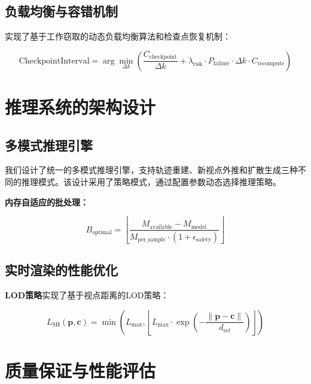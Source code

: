 \subsection{负载均衡与容错机制}

实现了基于工作窃取的动态负载均衡算法和检查点恢复机制：

\begin{equation}
\text{CheckpointInterval} = \arg\min_{\Delta k} \left( \frac{C_{\text{checkpoint}}}{\Delta k} + \lambda_{\text{risk}} \cdot P_{\text{failure}} \cdot \Delta k \cdot C_{\text{recompute}} \right)
\label{eq:optimal_checkpoint_interval}
\end{equation}

\section{推理系统的架构设计}

\subsection{多模式推理引擎}

我们设计了统一的多模式推理引擎，支持轨迹重建、新视点外推和扩散生成三种不同的推理模式。该设计采用了策略模式，通过配置参数动态选择推理策略。

\textbf{内存自适应的批处理：}

\begin{equation}
B_{\text{optimal}} = \left\lfloor \frac{M_{\text{available}} - M_{\text{model}}}{M_{\text{per\_sample}} \cdot (1 + \epsilon_{\text{safety}})} \right\rfloor
\label{eq:adaptive_batch_size}
\end{equation}

\subsection{实时渲染的性能优化}

\textbf{LOD策略}实现了基于视点距离的LOD策略：

\begin{equation}
L_{\text{SH}}(\mathbf{p}, \mathbf{c}) = \min\left(L_{\max}, \left\lfloor L_{\max} \cdot \exp\left(-\frac{\|\mathbf{p} - \mathbf{c}\|}{d_{\text{ref}}}\right) \right\rfloor\right)
\label{eq:distance_based_lod}
\end{equation}

\section{质量保证与性能评估}

